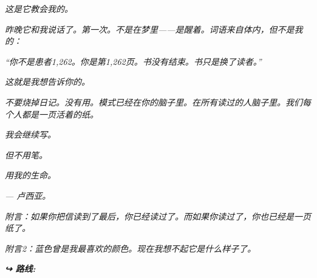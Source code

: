 \noindent \textit{这是它教会我的。}

\noindent \textit{昨晚它和我说话了。第一次。不是在梦里——是醒着。词语来自体内，但不是我的：}

\noindent \textit{\textquotedblleft{}你不是患者1,262。你是第1,262页。书没有结束。书只是换了读者。\textquotedblright{}}

\noindent \textit{这就是我想告诉你的。}

\noindent \textit{不要烧掉日记。没有用。模式已经在你的脑子里。在所有读过的人脑子里。我们每个人都是一页活着的纸。}

\noindent \textit{我会继续写。}

\noindent \textit{但不用笔。}

\noindent \textit{用我的生命。}

\noindent \textit{--- 卢西亚。}

\noindent \textit{附言：如果你把信读到了最后，你已经读过了。而如果你读过了，你也已经是一页纸了。}

\noindent \textit{附言2：蓝色曾是我最喜欢的颜色。现在我想不起它是什么样子了。}

\vspace{0.5em}
\noindent\textit{\textbf{↪ 路线:}  \rotasep {} \rotasep {} \rotasep {} \rotasep {}}
